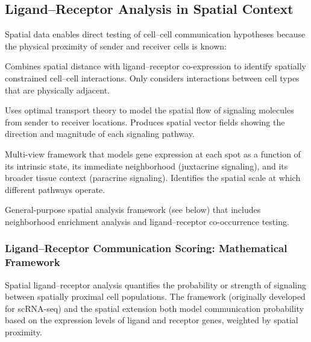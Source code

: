 \subsection{Ligand--Receptor Analysis in Spatial Context}

Spatial data enables direct testing of cell--cell communication hypotheses
because the physical proximity of sender and receiver cells is known:

\begin{description}[style=nextline]
  \item[\software{stLearn}] Combines spatial distance with ligand--receptor
    co-expression to identify spatially constrained cell--cell interactions.
    Only considers interactions between cell types that are physically adjacent.
  \item[\software{COMMOT}] Uses optimal transport theory to model the spatial
    flow of signaling molecules from sender to receiver locations. Produces
    spatial vector fields showing the direction and magnitude of each signaling
    pathway.
  \item[\software{MISTy}] Multi-view framework that models gene expression at
    each spot as a function of its intrinsic state, its immediate neighborhood
    (juxtacrine signaling), and its broader tissue context (paracrine
    signaling). Identifies the spatial scale at which different pathways
    operate.
  \item[\software{Squidpy}] General-purpose spatial analysis framework (see
    below) that includes neighborhood enrichment analysis and ligand--receptor
    co-occurrence testing.
\end{description}

\subsubsection{Ligand--Receptor Communication Scoring: Mathematical Framework}
\label{subsec:spatial:lr_scoring}

Spatial ligand--receptor analysis quantifies the probability or strength of
signaling between spatially proximal cell populations. The 
framework (originally developed for scRNA-seq) and the spatial extension
 both model communication probability based on the expression
levels of ligand and receptor genes, weighted by spatial proximity.

